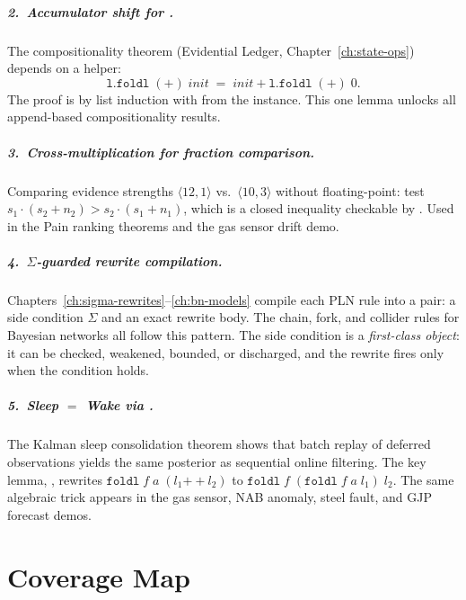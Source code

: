 \documentclass[11pt,openany]{report}
\begin{document}
\paragraph{2.\ Accumulator shift for .}
The compositionality theorem 
(Evidential Ledger, Chapter~\ref{ch:state-ops}) depends on a
helper:
\[
  \mathtt{l.foldl}\;(+)\;\mathit{init}
  \;=\; \mathit{init} + \mathtt{l.foldl}\;(+)\;0.
\]
The proof is by list induction with  from the
 instance.  This one lemma unlocks all
append-based compositionality results.

\paragraph{3.\ Cross-multiplication for fraction comparison.}
Comparing evidence strengths $\langle 12, 1\rangle$ vs.\
$\langle 10, 3\rangle$ without floating-point: test
$s_1 \cdot (s_2 + n_2) > s_2 \cdot (s_1 + n_1)$, which is a
closed  inequality checkable by .
Used in the Pain ranking theorems and the gas sensor drift
demo.

\paragraph{4.\ $\Sigma$-guarded rewrite compilation.}
Chapters~\ref{ch:sigma-rewrites}--\ref{ch:bn-models} compile
each PLN rule into a pair: a side condition $\Sigma$ and an
exact rewrite body.  The chain, fork, and collider rules for
Bayesian networks all follow this pattern.  The side condition
is a \emph{first-class object}: it can be checked, weakened,
bounded, or discharged, and the rewrite fires only when the
condition holds.

\paragraph{5.\ Sleep $=$ Wake via .}
The Kalman sleep consolidation theorem shows that batch replay
of deferred observations yields the same posterior as sequential
online filtering.  The key lemma,
, rewrites
$\mathtt{foldl}\;f\;a\;(l_1 \mathbin{+\!+} l_2)$ to
$\mathtt{foldl}\;f\;(\mathtt{foldl}\;f\;a\;l_1)\;l_2$.
The same algebraic trick appears in the gas sensor, NAB
anomaly, steel fault, and GJP forecast demos.


\chapter{Coverage Map}
\label{app:coverage-map}
\end{document}

